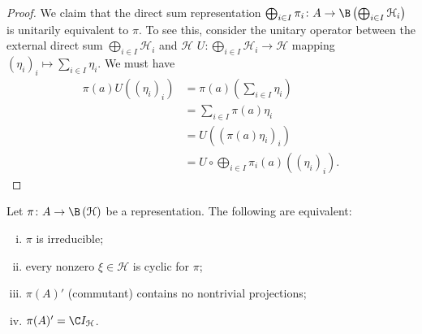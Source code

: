 \documentclass[10pt]{mypackage}
\begin{document}
\begin{proof}
  We claim that the direct sum representation $\bigoplus_{i\in I}\pi_i\colon A\rightarrow \B\left(\bigoplus_{i\in I}\mathcal{H}_i\right)$ is unitarily equivalent to $\pi$. To see this, consider the unitary operator between the external direct sum $\bigoplus_{i\in I}\mathcal{H}_i$ and $\mathcal{H}$  $U\colon \bigoplus_{i\in I}\mathcal{H}_i\rightarrow \mathcal{H}$ mapping $\left(\eta_i\right)_{i}\mapsto \sum_{i\in I}\eta_i$. We must have
  \begin{align*}
    \pi(a)U\left(\left(\eta_i\right)_i\right) &= \pi(a)\left(\sum_{i\in I}\eta_i\right)\\
                                              &= \sum_{i\in I}\pi(a)\eta_i\\
                                              &= U\left(\left(\pi(a)\eta_i\right)_i\right)\\
                                              &= U\circ \bigoplus_{i\in I}\pi_i(a)\left(\left(\eta_i\right)_i\right).
  \end{align*}
\end{proof}
\begin{proposition}
  Let $\pi\colon A\rightarrow \B\left(\mathcal{H}\right)$ be a representation. The following are equivalent:
  \begin{enumerate}[(i)]
    \item $\pi$ is irreducible;
    \item every nonzero $\xi\in \mathcal{H}$ is cyclic for $\pi$;
    \item $\pi(A)'$ (commutant) contains no nontrivial projections;
    \item $\pi(A)' = \C I_{\mathcal{H}}$.
  \end{enumerate}
\end{proposition}
\end{document}
